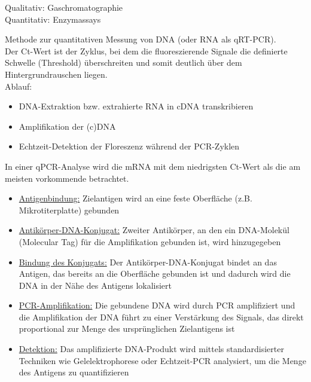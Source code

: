 Qualitativ: Gaschromatographie \\
Quantitativ: Enzymassays \\ \newline

Methode zur quantitativen Messung von DNA (oder RNA als qRT-PCR). \\ Der Ct-Wert ist der Zyklus, bei dem die fluoreszierende Signale die definierte Schwelle (Threshold) überschreiten und somit deutlich über dem Hintergrundrauschen liegen. \\
Ablauf: 
\begin{itemize}
    \item DNA-Extraktion bzw. extrahierte RNA in cDNA transkribieren 
    \item Amplifikation der (c)DNA
    \item Echtzeit-Detektion der Floreszenz während der PCR-Zyklen 
\end{itemize} 
In einer qPCR-Analyse wird die mRNA mit dem niedrigsten Ct-Wert als die am meisten vorkommende betrachtet. 
\\ \newline

\begin{itemize}
    \item \underline{Antigenbindung:} Zielantigen wird an eine feste Oberfläche (z.B. Mikrotiterplatte) gebunden
    \item \underline{Antikörper-DNA-Konjugat:} Zweiter Antikörper, an den ein DNA-Molekül (Molecular Tag) für die Amplifikation gebunden ist, wird hinzugegeben
    \item \underline{Bindung des Konjugats:} Der Antikörper-DNA-Konjugat bindet an das Antigen, das bereits an die Oberfläche gebunden ist und dadurch wird die DNA in der Nähe des Antigens lokalisiert
    \item \underline{PCR-Amplifikation:} Die gebundene DNA wird durch PCR amplifiziert und die Amplifikation der DNA führt zu einer Verstärkung des Signals, das direkt proportional zur Menge des ursprünglichen Zielantigens ist
    \item \underline{Detektion:} Das amplifizierte DNA-Produkt wird mittels standardisierter Techniken wie Gelelektrophorese oder Echtzeit-PCR analysiert, um die Menge des Antigens zu quantifizieren
\end{itemize}  $\ $ \\


